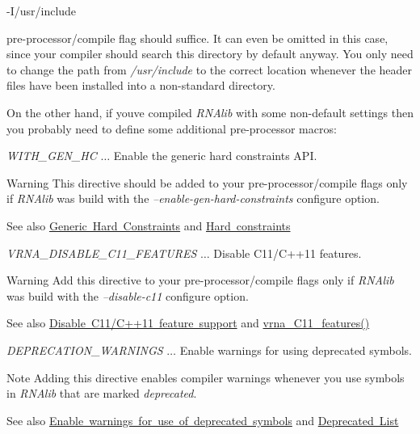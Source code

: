 \begin{DoxyVerb}-I/usr/include
\end{DoxyVerb}


pre-\/processor/compile flag should suffice. It can even be omitted in this case, since your compiler should search this directory by default anyway. You only need to change the path from {\itshape /usr/include} to the correct location whenever the header files have been installed into a non-\/standard directory.

On the other hand, if you\textquotesingle{}ve compiled {\itshape R\+N\+Alib} with some non-\/default settings then you probably need to define some additional pre-\/processor macros\+:


\begin{DoxyItemize}
\item {\itshape W\+I\+T\+H\+\_\+\+G\+E\+N\+\_\+\+HC} $\ldots$ Enable the generic hard constraints A\+PI. \begin{DoxyWarning}{Warning}
This directive should be added to your pre-\/processor/compile flags only if {\itshape R\+N\+Alib} was build with the {\itshape --enable-\/gen-\/hard-\/constraints} configure option. 
\end{DoxyWarning}
\begin{DoxySeeAlso}{See also}
\mbox{\hyperlink{install_config_generic_hc}{Generic Hard Constraints}} and \mbox{\hyperlink{group__hard__constraints}{Hard constraints}}
\end{DoxySeeAlso}

\item {\itshape V\+R\+N\+A\+\_\+\+D\+I\+S\+A\+B\+L\+E\+\_\+\+C11\+\_\+\+F\+E\+A\+T\+U\+R\+ES} $\ldots$ Disable C11/\+C++11 features. \begin{DoxyWarning}{Warning}
Add this directive to your pre-\/processor/compile flags only if {\itshape R\+N\+Alib} was build with the {\itshape --disable-\/c11} configure option. 
\end{DoxyWarning}
\begin{DoxySeeAlso}{See also}
\mbox{\hyperlink{install_config_c11}{Disable C11/\+C++11 feature support}} and \mbox{\hyperlink{group__data__structures_ga21744ae2d6a17309f9327d3547cef0cb}{vrna\+\_\+\+C11\+\_\+features()}}
\end{DoxySeeAlso}

\item {\itshape D\+E\+P\+R\+E\+C\+A\+T\+I\+O\+N\+\_\+\+W\+A\+R\+N\+I\+N\+GS} $\ldots$ Enable warnings for using deprecated symbols. \begin{DoxyNote}{Note}
Adding this directive enables compiler warnings whenever you use symbols in {\itshape R\+N\+Alib} that are marked {\itshape deprecated}. 
\end{DoxyNote}
\begin{DoxySeeAlso}{See also}
\mbox{\hyperlink{install_config_deprecated}{Enable warnings for use of deprecated symbols}} and \mbox{\hyperlink{deprecated}{Deprecated List}}
\end{DoxySeeAlso}


\end{DoxyItemize}
